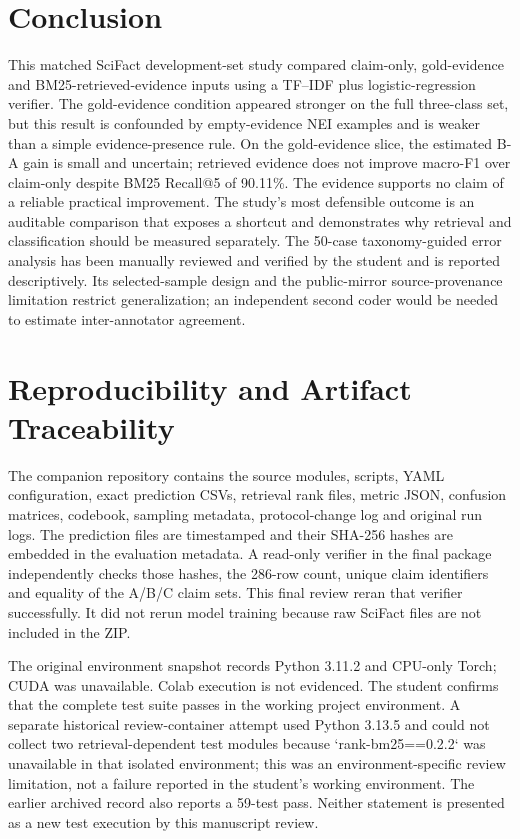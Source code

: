 \documentclass[10pt]{article}
\begin{document}
\section{Conclusion}
This matched SciFact development-set study compared claim-only, gold-evidence and BM25-retrieved-evidence inputs using a TF--IDF plus logistic-regression verifier. The gold-evidence condition appeared stronger on the full three-class set, but this result is confounded by empty-evidence NEI examples and is weaker than a simple evidence-presence rule. On the gold-evidence slice, the estimated B-A gain is small and uncertain; retrieved evidence does not improve macro-F1 over claim-only despite BM25 Recall@5 of 90.11\%. The evidence supports no claim of a reliable practical improvement. The study's most defensible outcome is an auditable comparison that exposes a shortcut and demonstrates why retrieval and classification should be measured separately. The 50-case taxonomy-guided error analysis has been manually reviewed and verified by the student and is reported descriptively. Its selected-sample design and the public-mirror source-provenance limitation restrict generalization; an independent second coder would be needed to estimate inter-annotator agreement.


\section{Reproducibility and Artifact Traceability}
The companion repository contains the source modules, scripts, YAML configuration, exact prediction CSVs, retrieval rank files, metric JSON, confusion matrices, codebook, sampling metadata, protocol-change log and original run logs. The prediction files are timestamped and their SHA-256 hashes are embedded in the evaluation metadata. A read-only verifier in the final package independently checks those hashes, the 286-row count, unique claim identifiers and equality of the A/B/C claim sets. This final review reran that verifier successfully. It did not rerun model training because raw SciFact files are not included in the ZIP.

The original environment snapshot records Python 3.11.2 and CPU-only Torch; CUDA was unavailable. Colab execution is not evidenced. The student confirms that the complete test suite passes in the working project environment. A separate historical review-container attempt used Python 3.13.5 and could not collect two retrieval-dependent test modules because `rank-bm25==0.2.2` was unavailable in that isolated environment; this was an environment-specific review limitation, not a failure reported in the student's working environment. The earlier archived record also reports a 59-test pass. Neither statement is presented as a new test execution by this manuscript review.
\end{document}
